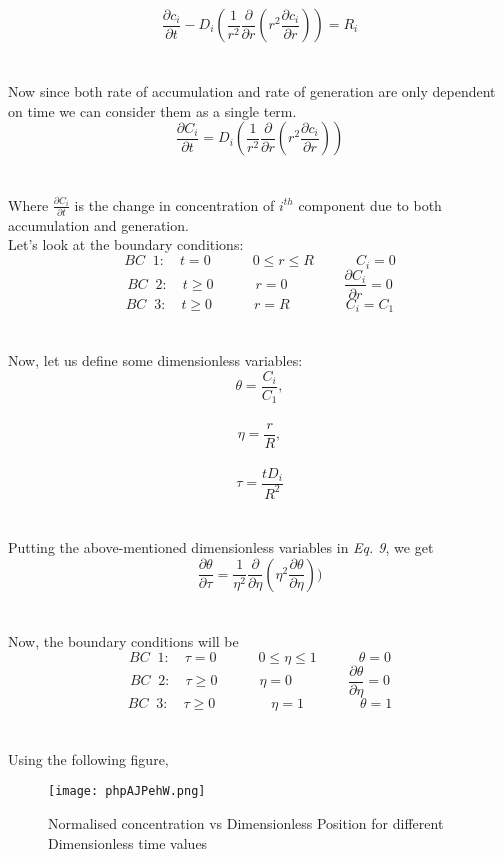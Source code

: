 \documentclass[10pt, a4paper]{article}
\begin{document}
\begin{equation}
    \frac{\partial c_i}{\partial t} - D_i(\frac{1}{r^2}\frac{\partial}{\partial r}(r^2\frac{\partial c_i}{\partial r})) = R_i
\end{equation}\\
\\
Now since both rate of accumulation and rate of generation are only dependent on time we can consider them as a single term. \\

\begin{equation}
    \label{differential}
    \frac{\partial C_i}{\partial t} = D_i(\frac{1}{r^2}\frac{\partial}{\partial r}(r^2\frac{\partial c_i}{\partial r}))
\end{equation}\\
\\
Where $\frac{\partial C_i}{\partial t}$ is the change in concentration of $i^{th}$ component due to both accumulation and generation.\\

Let's look at the boundary conditions: \\
\[BC\;\; 1:\quad t=0\quad\quad\quad 0\leq r\leq R\quad\quad\quad C_i=0\]
\[BC\;\; 2:\quad t\geq0\quad\quad\quad r=0 \quad\quad\quad\quad \frac{\partial C_i}{\partial r}=0\]
\[BC\;\; 3:\quad t\geq0\quad\quad\quad r=R \quad\quad\quad\quad C_i=C_1\]\\
\\
Now, let us define some dimensionless variables:\\

\[\theta=\frac{C_i}{C_1},\]\\
\[\eta=\frac{r}{R},\]\\
\[\tau=\frac{tD_i}{R^2}\]\\
\\
Putting the above-mentioned dimensionless variables in \emph{Eq. 9}, we get\\

\begin{equation}
    \frac{\partial \theta}{\partial \tau} = \frac{1}{\eta^2}\frac{\partial}{\partial \eta}(\eta^2\frac{\partial \theta}{\partial \eta}))
\end{equation}\\
\\
Now, the boundary conditions will be\\
\[BC\;\; 1:\quad \tau=0\quad\quad\quad 0\leq \eta\leq 1\quad\quad\quad \theta=0\]
\[BC\;\; 2:\quad \tau\geq0\quad\quad\quad \eta=0 \quad\quad\quad\quad \frac{\partial \theta}{\partial \eta}=0\]
\[BC\;\; 3:\quad \tau\geq0\quad\quad\quad\quad \eta=1 \quad\quad\quad\quad \theta=1\]\\
\\
Using the following figure,
\begin{figure}[H]
    \centering
    \texttt{[image: phpAJPehW.png]}
    \caption{Normalised concentration vs Dimensionless Position for different Dimensionless time values}
\end{figure} \\
\\
\newpage
\end{document}
